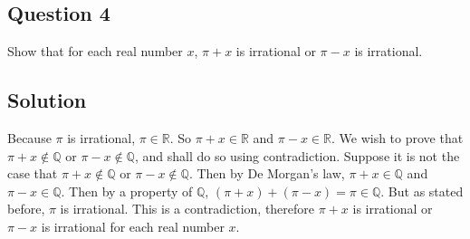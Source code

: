 \documentclass{article}
\begin{document}
\subsection*{Question 4}
    Show that for each real number $x$, $\pi + x$ is irrational or $\pi - x$ is irrational.

\subsection*{Solution}
    Because $\pi$ is irrational, $\pi \in \mathbb{R}$. So $\pi + x \in \mathbb{R}$ and $\pi - x \in \mathbb{R}$. We wish to prove that $\pi + x \notin \mathbb{Q}$ or $\pi - x \notin \mathbb{Q}$, and shall do so using contradiction. Suppose it is not the case that $\pi + x \notin \mathbb{Q}$ or $\pi - x \notin \mathbb{Q}$. Then by De Morgan's law, $\pi + x \in \mathbb{Q}$ and $\pi - x \in \mathbb{Q}$. Then by a property of $\mathbb{Q}$, $(\pi + x) + (\pi - x) = \pi \in \mathbb{Q}$. But as stated before, $\pi$ is irrational. This is a contradiction, therefore $\pi + x$ is irrational or $\pi - x$ is irrational for each real number $x$.
\end{document}
